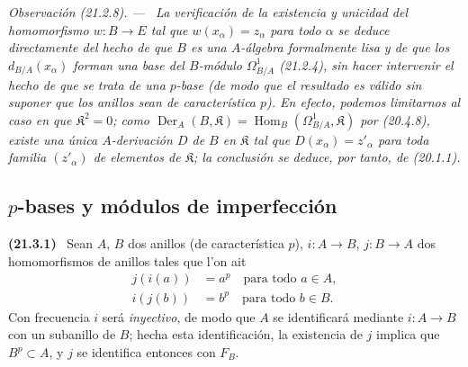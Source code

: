 \documentclass[10pt,oneside]{book}
\makeatletter
\newcommand{\setmanualcurrentlabel}[1]{\def\@currentlabel{#1}}
\newenvironment{env}[1][]{\setmanualcurrentlabel{#1}\par\medskip\noindent\textbf{(#1)}\ }{\par}
\newenvironment{remark}[1][]{%
  \setmanualcurrentlabel{#1}\par\medskip\noindent\itshape Observación (#1). ---\ }{\par}
\makeatother
\begin{document}
\begin{remark}[21.2.8]
\label{0.21.2.8-es}
La verificación de la existencia y unicidad del homomorfismo $w:B\to E$ tal
que $w(x_\alpha)=z_\alpha$ para todo $\alpha$ se deduce directamente del
hecho de que $B$ es una $A$-álgebra formalmente lisa y de que los
$d_{B/A}(x_\alpha)$ forman una base del $B$-módulo $\Omega^1_{B/A}$ (21.2.4),
sin hacer intervenir el hecho de que se trata de una $p$-base (de modo que el
resultado es válido sin suponer que los anillos sean de característica $p$).
En efecto, podemos limitarnos al caso en que $\mathfrak K^2=0$; como
$\operatorname{Der}_A(B,\mathfrak K)=\operatorname{Hom}_B(\Omega^1_{B/A},\mathfrak K)$
por (20.4.8), existe una única $A$-derivación $D$ de $B$ en $\mathfrak K$ tal que
$D(x_\alpha)=z'_\alpha$ para toda familia $(z'_\alpha)$ de elementos de
$\mathfrak K$; la conclusión se deduce, por tanto, de (20.1.1).
\end{remark}

\subsection{$p$-bases y módulos de imperfección}
\label{0.21.3-es}

\begin{env}[21.3.1]
\label{0.21.3.1-es}
Sean $A$, $B$ dos anillos (de característica $p$), $i:A\to B$,
$j:B\to A$ dos homomorfismos de anillos tales que l'on ait
\begin{align}
\tag{21.3.1.1}\label{0.21.3.1.1-es}
j(i(a))&=a^p\quad\text{para todo }a\in A,\\
\tag{21.3.1.2}\label{0.21.3.1.2-es}
i(j(b))&=b^p\quad\text{para todo }b\in B.
\end{align}
Con frecuencia $i$ será \emph{inyectivo}, de modo que $A$ se identificará mediante
$i:A\to B$ con un subanillo de $B$; hecha esta identificación, la existencia
de $j$ implica que $B^p\subset A$, y $j$ se identifica entonces con $F_B$.
\end{env}
\end{document}

